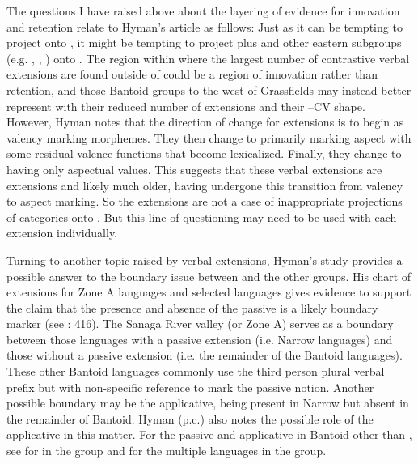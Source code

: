 \documentclass[output=paper]{langsci/langscibook}
\begin{document}
The questions I have raised above about the layering of evidence for innovation and retention relate to Hyman’s article as follows: Just as it can be tempting to project  onto , it might be tempting to project  plus  and other eastern  subgroups (e.g. , , ) onto . The region within  where the largest number of contrastive verbal extensions are found outside of  could be a region of innovation rather than retention, and those Bantoid groups to the west of Grassfields may instead better represent  with their reduced number of extensions and their –CV shape. However, Hyman notes that the direction of change for extensions is to begin as valency marking morphemes. They then change to primarily marking aspect with some residual valence functions that become lexicalized. Finally, they change to having only aspectual values. This suggests that these verbal extensions are  extensions and likely much older, having undergone this transition from valency to aspect marking. So the extensions are not a case of inappropriate projections of  categories onto . But this line of questioning may need to be used with each  extension individually. 

\newpage
Turning to another topic raised by verbal extensions, Hyman’s study provides a possible answer to the boundary issue between  and the other  groups. His chart of extensions for  Zone A languages and selected  languages gives evidence to support the claim that the presence and absence of the passive is a likely boundary marker (see \citealt{Watters1989}: 416). The Sanaga River valley (or  Zone A) serves as a boundary between those languages with a passive extension (i.e. Narrow  languages) and those without a passive extension (i.e. the remainder of the Bantoid languages). These other Bantoid languages commonly use the third person plural verbal prefix but with non-specific reference to mark the passive notion. Another possible boundary may be the applicative, being present in Narrow  but absent in the remainder of Bantoid. Hyman (p.c.) also notes the possible role of the applicative in this matter. For the passive and applicative in Bantoid other than , see \citet[360]{Watters1981} for  in the  group and \citet[252]{Watters2003} for the multiple languages in the  group. 
\end{document}
